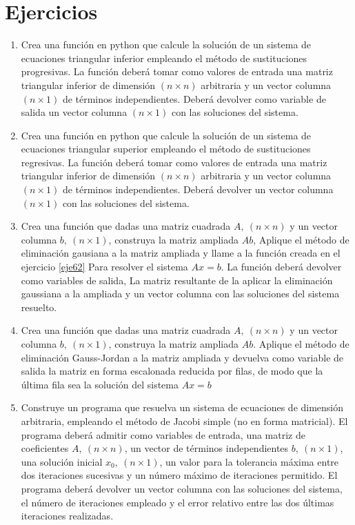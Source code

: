 \section{Ejercicios}
\begin{enumerate}
\item Crea una función en python que calcule la solución de un sistema de ecuaciones triangular inferior empleando el método de sustituciones progresivas. La función deberá tomar como valores de entrada una matriz triangular inferior de dimensión $(n\times n)$ arbitraria y un vector columna $(n\times 1)$ de términos independientes. Deberá devolver como variable de salida un vector columna $(n\times 1)$ con las soluciones del sistema.

\item \label{eje62} Crea una función en python que calcule la solución de un sistema de ecuaciones triangular superior empleando el método de sustituciones regresivas. La función deberá tomar como valores de entrada una matriz triangular inferior de dimensión $(n\times n)$ arbitraria y un vector columna $(n\times 1)$ de términos independientes. Deberá devolver un vector columna $(n\times 1)$ con las soluciones del sistema.

\item Crea una función que dadas una matriz cuadrada  $ A,\ (n\times n)$ y un  vector columna $b,\ (n\times 1)$, construya la matriz ampliada $Ab$, Aplique el método de eliminación gausiana a la matriz ampliada y llame a la función creada en el ejercicio \ref{eje62} Para resolver el sistema $Ax=b$. La función deberá devolver como variables de salida, La matriz resultante de la aplicar la eliminación gaussiana a la ampliada y un vector columna con las soluciones del sistema resuelto. 

\item Crea una función que dadas una matriz cuadrada  $ A,\ (n\times n)$ y un  vector columna $b,\ (n\times 1)$, construya la matriz ampliada $Ab$. Aplique el método de eliminación Gauss-Jordan a la matriz ampliada y devuelva como variable de salida la matriz en forma escalonada reducida por filas, de modo que la última fila sea la solución del sistema $Ax=b$  

\item Construye un programa que resuelva un sistema de ecuaciones de dimensión arbitraria, empleando el método de Jacobi simple (no en forma matricial). El programa deberá admitir como variables de entrada, una matriz de coeficientes $ A,\ (n\times n)$, un vector de términos independientes $b,\ (n\times 1)$, una solución inicial $x_0 ,\ (n\times 1)$, un valor para la tolerancia máxima entre dos iteraciones sucesivas y un número máximo de iteraciones permitido. El programa deberá devolver un vector columna con las soluciones del sistema, el número de iteraciones empleado y el error relativo entre las dos últimas iteraciones realizadas.


\end{enumerate}
